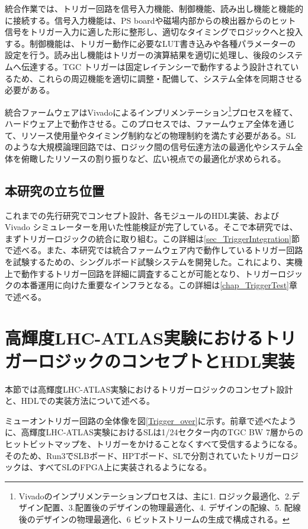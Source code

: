 統合作業では、トリガー回路を信号入力機能、制御機能、読み出し機能と機能的に接続する。信号入力機能は、PS boardや磁場内部からの検出器からのヒット信号をトリガー入力に適した形に整形し、適切なタイミングでロジックへと投入する。制御機能は、トリガー動作に必要なLUT書き込みや各種パラメーターの設定を行う。読み出し機能はトリガーの演算結果を適切に処理し、後段のシステムへ伝達する。TGC トリガーは固定レイテンシーで動作するよう設計されているため、これらの周辺機能を適切に調整・配備して、システム全体を同期させる必要がある。

統合ファームウェアはVivadoによるインプリメンテーション\footnote{Vivadoのインプリメンテーションプロセスは、主に1. ロジック最適化、2.デザイン配置、3.配置後のデザインの物理最適化、4. デザインの配線、5. 配線後のデザインの物理最適化、6 ビットストリームの生成で構成される。}プロセスを経て、ハードウェア上で動作させる。このプロセスでは、ファームウェア全体を通じて、リソース使用量やタイミング制約などの物理制約を満たす必要がある。SLのような大規模論理回路では、ロジック間の信号伝達方法の最適化やシステム全体を俯瞰したリソースの割り振りなど、広い視点での最適化が求められる。

\subsection*{本研究の立ち位置}
これまでの先行研究でコンセプト設計、各モジュールのHDL実装、およびVivado シミュレーターを用いた性能検証が完了している。そこで本研究では、まずトリガーロジックの統合に取り組む。この詳細は\ref{sec_TriggerIntegration}節で述べる。また、本研究では統合ファームウェア内で動作しているトリガー回路を試験するための、シングルボード試験システムを開発した。これにより、実機上で動作するトリガー回路を詳細に調査することが可能となり、トリガーロジックの本番運用に向けた重要なインフラとなる。この詳細は\ref{chap_TriggerTest}章で述べる。

\section{高輝度LHC-ATLAS実験におけるトリガーロジックのコンセプトとHDL実装}
\label{sec_Phase2TriggerLogic}
本節では高輝度LHC-ATLAS実験におけるトリガーロジックのコンセプト設計と、HDLでの実装方法について述べる。

ミューオントリガー回路の全体像を図\ref{Trigger_over}に示す。前章で述べたように、高輝度LHC-ATLAS実験におけるSLは1/24セクター内のTGC BW 7層からのヒットビットマップを、トリガーをかけることなくすべて受信するようになる。そのため、Run3でSLBボード、HPTボード、SLで分割されていたトリガーロジックは、すべてSLのFPGA上に実装されるようになる。

